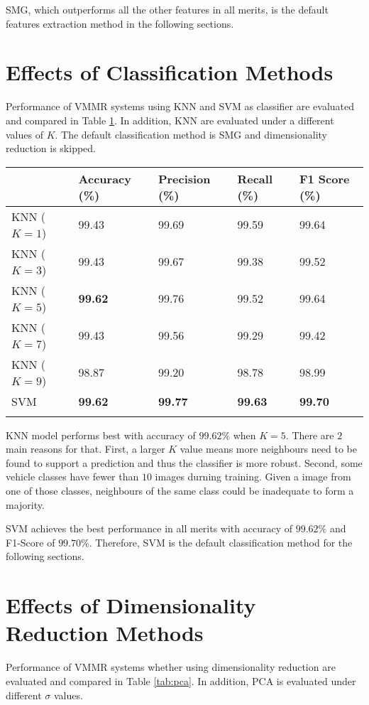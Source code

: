 SMG, which outperforms all the other features in all merits, is the default features extraction method in the following sections.

\section{Effects of Classification Methods}
\label{sec:effects-cls}
Performance of VMMR systems using KNN and SVM as classifier are evaluated and compared in Table \ref{tab:classifiers}.
In addition, KNN are evaluated under a different values of $K$.
The default classification method is SMG and dimensionality reduction is skipped.

\begin{longtable}[]{@{}lllll@{}}
\toprule
& Accuracy (\%) & Precision (\%) & Recall (\%) & F1 Score
(\%)\tabularnewline
\midrule
\endhead
KNN (\(K=1\)) & 99.43 & 99.69 & 99.59 & 99.64\tabularnewline
KNN (\(K=3\)) & 99.43 & 99.67 & 99.38 & 99.52\tabularnewline
KNN (\(K=5\)) & \textbf{99.62} & 99.76 & 99.52 & 99.64\tabularnewline
KNN (\(K=7\)) & 99.43 & 99.56 & 99.29 & 99.42\tabularnewline
KNN (\(K=9\)) & 98.87 & 99.20 & 98.78 & 98.99\tabularnewline
SVM & \textbf{99.62} & \textbf{99.77} & \textbf{99.63} &
\textbf{99.70}\tabularnewline
\bottomrule
\label{tab:classifiers}
\end{longtable}


KNN model performs best with accuracy of $99.62\%$ when $K = 5$.
There are $2$ main reasons for that. 
First, a larger $K$ value means more neighbours need to be found to support a prediction and thus the classifier is more robust.
Second, some vehicle classes have fewer than $10$ images durning training. Given a image from one of those classes, neighbours of the same class could be inadequate to form a majority.

SVM achieves the best performance in all merits with accuracy of $99.62\%$ and F1-Score of $99.70\%$. 
Therefore, SVM is the default classification method for the following sections.

\section{Effects of Dimensionality Reduction Methods}
\label{sec:effects-dim}
Performance of VMMR systems whether using dimensionality reduction are evaluated and compared in Table \ref{tab:pca}.
In addition, PCA is evaluated under different $\sigma$ values.

